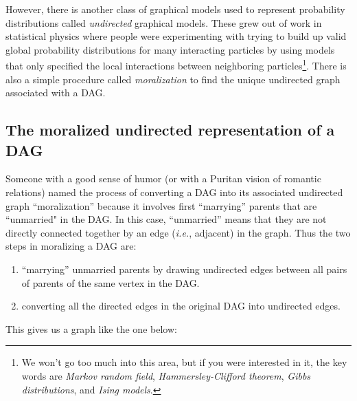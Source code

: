 \documentclass[11pt]{article}
\newcommand{\ie}{{\em i.e.},\xspace }
\begin{document}
However, there is another class of graphical models used to represent probability distributions
called {\em undirected} graphical models.  These grew out of work in statistical physics where
people were experimenting with trying to build up valid global probability distributions for
many interacting particles by using models that only specified the local interactions between
neighboring particles\footnote{We won't go too much into this area, but if you were interested
in it, the key words are {\em Markov random field}, {\em Hammersley-Clifford theorem}, {\em Gibbs distributions}, and {\em Ising models}.}.  
There is also a simple procedure called {\em moralization} to find the unique undirected graph
associated with a DAG.

\subsection{The moralized undirected representation of a DAG}
Someone with a good sense of humor (or with a Puritan vision of romantic relations) named the process of converting a DAG into
its associated undirected graph ``moralization'' because it involves first
``marrying'' parents that are ``unmarried" in the DAG\@.  In this case,
``unmarried'' means that they are not directly connected together by an edge (\ie adjacent) in the
graph.  Thus the two steps in moralizing a DAG are:
\begin{enumerate}
\item ``marrying'' unmarried parents by drawing undirected edges between all pairs of 
parents of the same vertex in the DAG.
\item converting all the directed edges in the original DAG into undirected edges.
\end{enumerate}
This gives us a graph like the one below:
\end{document}

